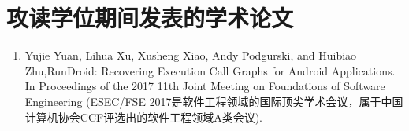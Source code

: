 



\chapter*{攻读学位期间发表的学术论文}






\begin{enumerate}
	
	\item Yujie Yuan, Lihua Xu, Xusheng Xiao, Andy Podgurski, and Huibiao Zhu,RunDroid: Recovering Execution Call Graphs for Android Applications. In Proceedings of the 2017 11th Joint Meeting on Foundations of Software Engineering 
	(ESEC/FSE 2017是软件工程领域的国际顶尖学术会议，属于中国计算机协会CCF评选出的软件工程领域A类会议).
	
\end{enumerate}


